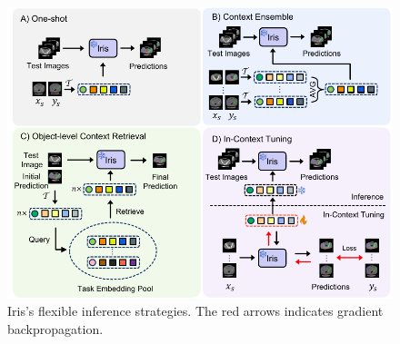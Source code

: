 \begin{figure}[t]
\begin{center}
\includegraphics[width=\columnwidth]{./fig/inference_strategy.pdf}
\end{center}
\vspace{-1em}
\caption{Iris's flexible inference strategies. The red arrows indicates gradient backpropagation.}
\label{fig:inference_strategy}
\vspace{-1em}
\end{figure}





